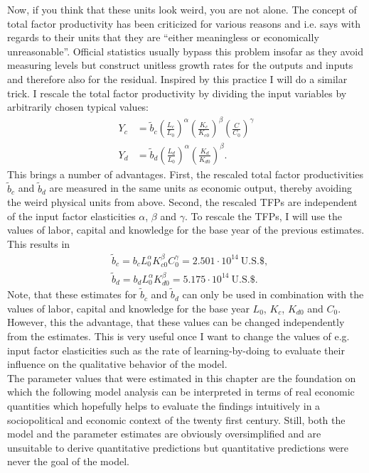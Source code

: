 Now, if you think that these units look weird, you are not alone. The concept of total factor productivity has been criticized for various reasons and i.e.\cite{Barnett2007} says with regards to their units that they are ``either meaningless or economically unreasonable''. Official statistics usually bypass this problem insofar as they avoid measuring levels but construct unitless growth rates for the outputs and inputs and therefore also for the residual. Inspired by this practice I will do a similar trick. I rescale the total factor productivity by dividing the input variables by arbitrarily chosen typical values:
\begin{align}
  Y_c &= \tilde{b}_c \left( \frac{L_c}{L_0} \right)^{\alpha} \left( \frac{K_c}{K_{c0}} \right)^{\beta} \left( \frac{C}{C_0} \right)^{\gamma} \nonumber \\
  Y_d &= \tilde{b}_d \left( \frac{L_d}{L_0} \right)^{\alpha} \left( \frac{K_d}{K_{d0}} \right)^{\beta}.
  \label{eq:rescalled_TFP}
\end{align}
This brings a number of advantages. First, the rescaled total factor productivities $\tilde{b}_c$ and $\tilde{b}_d$ are measured in the same units as economic output, thereby avoiding the weird physical units from above. Second, the rescaled TFPs are independent of the input factor elasticities $\alpha$, $\beta$ and $\gamma$.
To rescale the TFPs, I will use the values of labor, capital and knowledge for the base year of the previous estimates. This results in
\begin{align}
  &\tilde{b}_c = b_c L_0^{\alpha}K_{c0}^\beta C_0^{\gamma} = 2.501 \cdot 10^{14} ~ \mathrm{U.S. \$}, \\
  &\tilde{b}_d = b_d L_0^{\alpha}K_{d0}^\beta = 5.175 \cdot 10^{14} ~ \mathrm{U.S. \$}.
  \label{eq:rescalled_TFP_values}
\end{align}
Note, that these estimates for $\tilde{b}_c$ and $\tilde{b}_d$ can only be used in combination with the values of labor, capital and knowledge for the base year $L_0$, $K_{c}$, $K_{d0}$ and $C_0$. However, this the advantage, that these values can be changed independently from the estimates. This is very useful once I want to change the values of e.g. input factor elasticities such as the rate of learning-by-doing to evaluate their influence on the qualitative behavior of the model.\\

The parameter values that were estimated in this chapter are the foundation on which the following model analysis can be interpreted in terms of real economic quantities which hopefully helps to evaluate the findings intuitively in a sociopolitical and economic context of the twenty first century.
Still, both the model and the parameter estimates are obviously oversimplified and are unsuitable to derive quantitative predictions but quantitative predictions were never the goal of the model.

